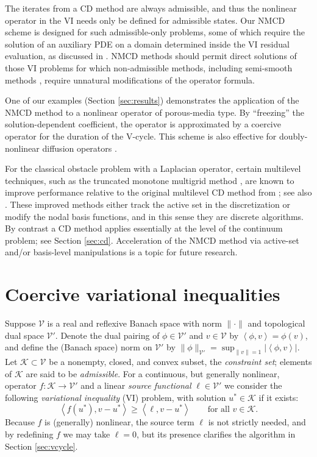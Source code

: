 \documentclass[letterpaper,final,12pt,reqno]{amsart}
\theoremstyle{cstyle}
\theoremstyle{cstyle*}
\theoremstyle{dstyle}
\numberwithin{equation}{section}
\numberwithin{figure}{section}
\numberwithin{table}{section}
\numberwithin{theorem}{section}
\newcommand{\cK}{\mathcal{K}}
\newcommand{\cV}{\mathcal{V}}
\newcommand{\ip}[2]{\left<#1,#2\right>}
\begin{document}
The iterates from a CD method are always admissible, and thus the nonlinear operator in the VI needs only be defined for admissible states.  Our NMCD scheme is designed for such admissible-only problems, some of which require the solution of an auxiliary PDE on a domain determined inside the VI residual evaluation, as discussed in \cite{Bueler2021conservation}.  NMCD methods should permit direct solutions of those VI problems for which non-admissible methods, including semi-smooth methods \cite{BensonMunson2006}, require unnatural modifications of the operator formula.

One of our examples (Section \ref{sec:results}) demonstrates the application of the NMCD method to a nonlinear operator of porous-media type.  By ``freezing'' the solution-dependent coefficient, the operator is approximated by a coercive operator for the duration of the V-cycle.  This scheme is also effective for doubly-nonlinear diffusion operators \cite[for example]{Bueler2021conservation,Calvoetal2002}.

For the classical obstacle problem with a Laplacian operator, certain multilevel techniques, such as the truncated monotone multigrid method \cite{Kornhuber1994}, are known to improve performance relative to the original multilevel CD method from \cite{Tai2003}; see also \cite{GraeserKornhuber2009}.  These improved methods either track the active set in the discretization or modify the nodal basis functions, and in this sense they are discrete algorithms.  By contrast a CD method applies essentially at the level of the continuum problem; see Section \ref{sec:cd}.  Acceleration of the NMCD method via active-set and/or basis-level manipulations is a topic for future research.


\section{Coercive variational inequalities} \label{sec:vi}

Suppose $\cV$ is a real and reflexive Banach space with norm $\|\cdot\|$ and topological dual space $\cV'$.  Denote the dual pairing of $\phi \in \cV'$ and $v\in\cV$ by $\ip{\phi}{v} = \phi(v)$, and define the (Banach space) norm on $\cV'$ by $\|\phi\|_{\cV'} = \sup_{\|v\|=1} |\ip{\phi}{v}|$.  Let $\cK \subset \cV$ be a nonempty, closed, and convex subset, the \emph{constraint set}; elements of $\cK$ are said to be \emph{admissible}.  For a continuous, but generally nonlinear, operator $f:\cK \to \cV'$ and a linear \emph{source functional} $\ell\in \cV'$ we consider the following \emph{variational inequality} (VI) problem, with solution $u^*\in \cK$ if it exists:
\begin{equation}
\ip{f(u^*)}{v-u^*} \ge \ip{\ell}{v-u^*} \qquad \text{for all } v\in \cK. \label{eq:vi}
\end{equation}
Because $f$ is (generally) nonlinear, the source term $\ell$ is not strictly needed, and by redefining $f$ we may take $\ell=0$, but its presence clarifies the algorithm in Section \ref{sec:vcycle}.
\end{document}
